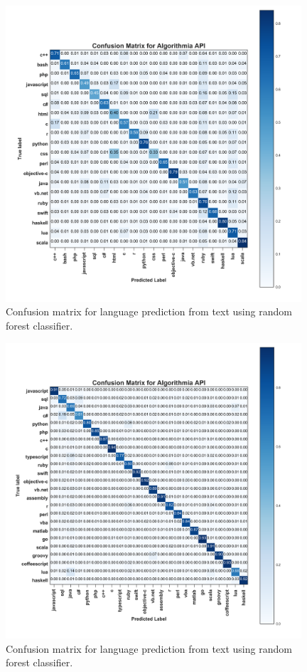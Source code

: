 \documentclass[letterpaper, 10 pt, conference]{ieeeconf}  %
\begin{document}
\begin{figure}[t]
  \centering
  \includegraphics[width=11cm]{Fig/ConfusionMatrixAlgorithmia}
  \caption{Confusion matrix for language prediction from text using random forest classifier.}
  \label{fig:AlgorithmiaConf}
\end{figure}

\begin{figure}[t]
  \centering
  \includegraphics[width=11cm]{Fig/ConfusionMatrixOurCdeText}
  \caption{Confusion matrix for language prediction from text using random forest classifier.}
  \label{fig:CodeTextConf}
\end{figure}
\end{document}
